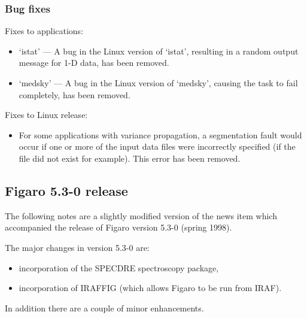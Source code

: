 \documentclass[11pt,twoside]{article}
\begin{document}
\subsubsection{Bug fixes}

   Fixes to applications:

\begin{itemize}
\item `istat'  --- A bug in the Linux version of `istat', resulting
               in a random output message for 1-D data, has been
               removed.
\item `medsky' --- A bug in the Linux version of `medsky', causing the
               task to fail completely, has been removed.
\end{itemize}

   Fixes to Linux release:

\begin{itemize}
\item For some applications with variance propagation, a segmentation
      fault would occur if one or more of the input data files were
      incorrectly specified (if the file did not exist for example).
      This error has been removed.
\end{itemize}


\subsection{\label{news530}Figaro 5.3-0 release}

 The following notes are a slightly modified version of the news item
 which accompanied the release of Figaro version 5.3-0 (spring 1998).

 The major changes in version 5.3-0 are:

\begin{itemize}

  \item incorporation of the SPECDRE spectroscopy package,

  \item incorporation of IRAFFIG (which allows Figaro to be run from IRAF).

\end{itemize}

 In addition there are a couple of minor enhancements.

\vspace{5mm}
\end{document}
